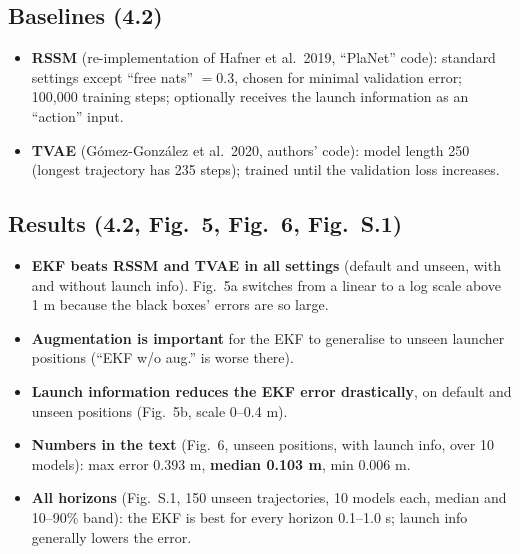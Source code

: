 \documentclass[11pt,a4paper]{article}
\begin{document}
\subsection{Baselines (4.2)}
\begin{itemize}
\item \textbf{RSSM} (re-implementation of Hafner et al.\ 2019, ``PlaNet'' code): standard settings except ``free nats'' $=0.3$, chosen for minimal validation error; 100{,}000 training steps; optionally receives the launch information as an ``action'' input.
\item \textbf{TVAE} (G\'omez-Gonz\'alez et al.\ 2020, authors' code): model length 250 (longest trajectory has 235 steps); trained until the validation loss increases.
\end{itemize}

\subsection{Results (4.2, Fig.~5, Fig.~6, Fig.~S.1)}
\begin{itemize}
\item \textbf{EKF beats RSSM and TVAE in all settings} (default and unseen, with and without launch info). Fig.~5a switches from a linear to a log scale above 1 m because the black boxes' errors are so large.
\item \textbf{Augmentation is important} for the EKF to generalise to unseen launcher positions (``EKF w/o aug.'' is worse there).
\item \textbf{Launch information reduces the EKF error drastically}, on default and unseen positions (Fig.~5b, scale 0--0.4 m).
\item \textbf{Numbers in the text} (Fig.~6, unseen positions, with launch info, over 10 models): max error 0.393 m, \textbf{median 0.103 m}, min 0.006 m.
\item \textbf{All horizons} (Fig.~S.1, 150 unseen trajectories, 10 models each, median and 10--90\% band): the EKF is best for every horizon 0.1--1.0 s; launch info generally lowers the error.
\end{itemize}
\end{document}
